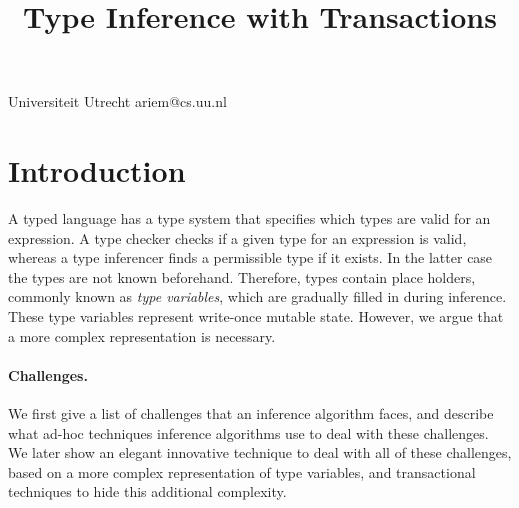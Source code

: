 \documentclass[preprint,natbib]{sigplanconf}
\begin{document}
\title{Type Inference with Transactions}

           {Universiteit Utrecht}
           {ariem@cs.uu.nl}

\section{Introduction}

  A typed language has a type system that specifies which types are valid for
  an expression. A type checker checks if a given type for an expression is
  valid, whereas a type inferencer finds a permissible type if it exists. In the
  latter case the types are not known beforehand. Therefore, types contain place
  holders, commonly known as {\it type variables}, which are gradually filled in
  during inference. These type variables represent write-once mutable state.
  However, we argue that a more complex representation is necessary.

  \paragraph{Challenges.}
  We first give a list of challenges that an inference algorithm faces, and
  describe what ad-hoc techniques inference algorithms use to deal with these
  challenges. We later show an elegant innovative technique to deal with all of these
  challenges, based on a more complex representation of type variables, and
  transactional techniques to hide this additional complexity.
\end{document}
